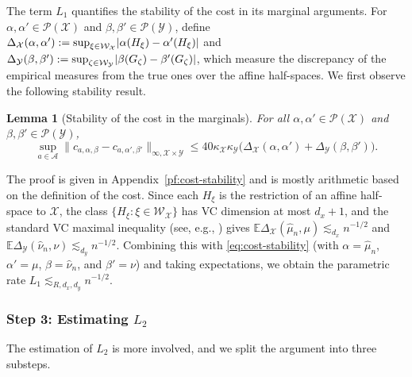 \documentclass[11pt]{amsart}
\newtheorem{lemma}[theorem]{Lemma}
\theoremstyle{definition}
\theoremstyle{remark}
\newcommand{\cA}{\mathcal{A}}
\newcommand{\E}{\mathbb{E}}
\newcommand{\1}{\mathbf{1}}
\DeclarePairedDelimiter{\abs}{\lvert}{\rvert}
\numberwithin{equation}{section}
\begin{document}
The term $L_1$ quantifies the stability of the cost in its marginal
arguments. For $\alpha,\alpha'\in\mathcal{P}(\mathcal{X})$ and
$\beta,\beta'\in\mathcal{P}(\mathcal{Y})$, define
$\Delta_{\mathcal X}(\alpha,\alpha')
:= \sup_{\xi\in\mathcal W_{\mathcal X}}\abs{\alpha(H_\xi)-\alpha'(H_\xi)}$
and
$\Delta_{\mathcal Y}(\beta,\beta')
:= \sup_{\zeta\in\mathcal W_{\mathcal Y}}\abs{\beta(G_\zeta)-\beta'(G_\zeta)}$,
which measure the discrepancy of the empirical measures from the true ones
over the affine half-spaces. We first observe the following stability
result.
\begin{lemma}[Stability of the cost in the marginals]\label{lem:cost-stability}
For all $\alpha,\alpha'\in\mathcal{P}(\mathcal{X})$ and
$\beta,\beta'\in\mathcal{P}(\mathcal{Y})$,
\begin{equation}\label{eq:cost-stability}
  \sup_{a\in\cA}
  \|c_{a,\alpha,\beta}-c_{a,\alpha',\beta'}\|_{\infty,\mathcal X\times\mathcal Y}
  \le 40\kappa_{\mathcal X}\kappa_{\mathcal Y}
  \bigl(\Delta_{\mathcal X}(\alpha,\alpha')+\Delta_{\mathcal Y}(\beta,\beta')\bigr).
\end{equation}
\end{lemma}

\noindent The proof is given in Appendix~\ref{pf:cost-stability} and is
mostly arithmetic based on the definition of the cost. Since each $H_\xi$
is the restriction of an affine half-space to $\mathcal{X}$, the class
$\{H_\xi:\xi\in\mathcal W_{\mathcal X}\}$ has VC dimension at most
$d_x+1$, and the standard VC maximal inequality (see, e.g.,
\cite[Proposition 3.6.6, Theorem 3.6.9, Corollary 3.5.8]{GineNickl2016}) gives
$\E\Delta_{\mathcal X}(\widehat\mu_n,\mu)\lesssim_{d_x}n^{-1/2}$ and
$\E\Delta_{\mathcal Y}(\widehat\nu_n,\nu)\lesssim_{d_y}n^{-1/2}$.
Combining this with \eqref{eq:cost-stability} (with $\alpha=\widehat\mu_n$,
$\alpha'=\mu$, $\beta=\widehat\nu_n$, and $\beta'=\nu$) and taking expectations, we obtain the parametric rate
$L_1 \lesssim_{R,d_x,d_y} n^{-1/2}$.

\subsubsection*{Step 3: Estimating $L_2$}
The estimation of $L_2$ is more involved, and we split the argument into
three substeps.
\end{document}
